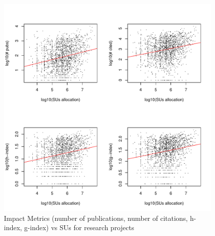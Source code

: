 \documentclass{sig-alternate}
\begin{document}
\begin{figure}[!htb] 
  \centering 
    \includegraphics[width=1.0\columnwidth]{images/02_metrics_vs_alloc_research_proj.pdf} 
  \caption{Impact Metrics (number of publications, number of citations, h-index, g-index) vs SUs for research projects}\label{F:metrics-vs-alloc-research-proj} 
\end{figure} 
 
\end{document}
